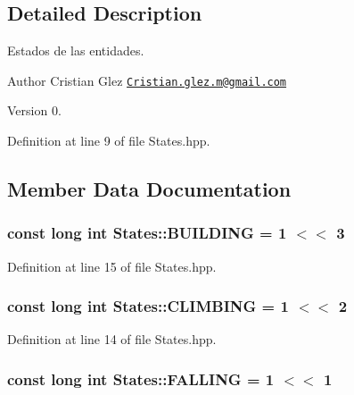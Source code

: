 \subsection{Detailed Description}
Estados de las entidades. 

\begin{DoxyAuthor}{Author}
Cristian Glez \href{mailto:Cristian.glez.m@gmail.com}{\tt Cristian.\+glez.\+m@gmail.\+com} 
\end{DoxyAuthor}
\begin{DoxyVersion}{Version}
0. 
\end{DoxyVersion}


Definition at line 9 of file States.\+hpp.



\subsection{Member Data Documentation}
\hypertarget{class_states_a1a05b30c6f6c881b703c40f217890ac2}{
\subsubsection[{B\+U\+I\+L\+D\+I\+N\+G}]{\setlength{\rightskip}{0pt plus 5cm}const long int States\+::\+B\+U\+I\+L\+D\+I\+N\+G = 1 $<$$<$ 3\hspace{0.3cm}{\ttfamily [static]}}}\label{class_states_a1a05b30c6f6c881b703c40f217890ac2}


Definition at line 15 of file States.\+hpp.

\hypertarget{class_states_a1a5a36f0f204d9dda0ebd0a09b6fd7fe}{
\subsubsection[{C\+L\+I\+M\+B\+I\+N\+G}]{\setlength{\rightskip}{0pt plus 5cm}const long int States\+::\+C\+L\+I\+M\+B\+I\+N\+G = 1 $<$$<$ 2\hspace{0.3cm}{\ttfamily [static]}}}\label{class_states_a1a5a36f0f204d9dda0ebd0a09b6fd7fe}


Definition at line 14 of file States.\+hpp.

\hypertarget{class_states_ae464e17ebc3214e3c17186d614e37c54}{
\subsubsection[{F\+A\+L\+L\+I\+N\+G}]{\setlength{\rightskip}{0pt plus 5cm}const long int States\+::\+F\+A\+L\+L\+I\+N\+G = 1 $<$$<$ 1\hspace{0.3cm}{\ttfamily [static]}}}\label{class_states_ae464e17ebc3214e3c17186d614e37c54}


